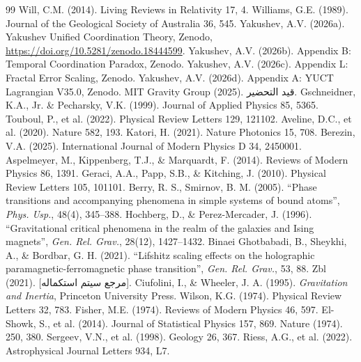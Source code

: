 \documentclass[11pt,a4paper]{article}
\begin{document}
\begin{thebibliography}{99}
		 Will, C.M. (2014). Living Reviews in Relativity 17, 4.
		 Williams, G.E. (1989). Journal of the Geological Society of Australia 36, 545.
		 Yakushev, A.V. (2026a). Yakushev Unified Coordination Theory, Zenodo, \url{https://doi.org/10.5281/zenodo.18444599}.
		 Yakushev, A.V. (2026b). Appendix B: Temporal Coordination Paradox, Zenodo.
		 Yakushev, A.V. (2026c). Appendix L: Fractal Error Scaling, Zenodo.
		 Yakushev, A.V. (2026d). Appendix A: YUCT Lagrangian V35.0, Zenodo.
		 MIT Gravity Group (2025). قيد التحضير.
		 Gschneidner, K.A., Jr. \& Pecharsky, V.K. (1999). Journal of Applied Physics 85, 5365.
		 Touboul, P., et al. (2022). Physical Review Letters 129, 121102.
		 Aveline, D.C., et al. (2020). Nature 582, 193.
		 Katori, H. (2021). Nature Photonics 15, 708.
		 Berezin, V.A. (2025). International Journal of Modern Physics D 34, 2450001.
		 Aspelmeyer, M., Kippenberg, T.J., \& Marquardt, F. (2014). Reviews of Modern Physics 86, 1391.
		 Geraci, A.A., Papp, S.B., \& Kitching, J. (2010). Physical Review Letters 105, 101101.
		 Berry, R. S., Smirnov, B. M. (2005). ``Phase transitions and accompanying phenomena in simple systems of bound atoms'', \textit{Phys. Usp.}, 48(4), 345–388.
		 Hochberg, D., \& Perez-Mercader, J. (1996). ``Gravitational critical phenomena in the realm of the galaxies and Ising magnets'', \textit{Gen. Rel. Grav.}, 28(12), 1427–1432.
		 Binaei Ghotbabadi, B., Sheykhi, A., \& Bordbar, G. H. (2021). ``Lifshitz scaling effects on the holographic paramagnetic-ferromagnetic phase transition'', \textit{Gen. Rel. Grav.}, 53, 88.
		 Zbl (2021). [مرجع سيتم استكماله].
		 Ciufolini, I., \& Wheeler, J. A. (1995). \textit{Gravitation and Inertia}, Princeton University Press.
		 Wilson, K.G. (1974). Physical Review Letters 32, 783.
		 Fisher, M.E. (1974). Reviews of Modern Physics 46, 597.
		 El-Showk, S., et al. (2014). Journal of Statistical Physics 157, 869.
		 Nature (1974). 250, 380.
		 Sergeev, V.N., et al. (1998). Geology 26, 367.
		 Riess, A.G., et al. (2022). Astrophysical Journal Letters 934, L7.

\end{thebibliography}
\end{document}
